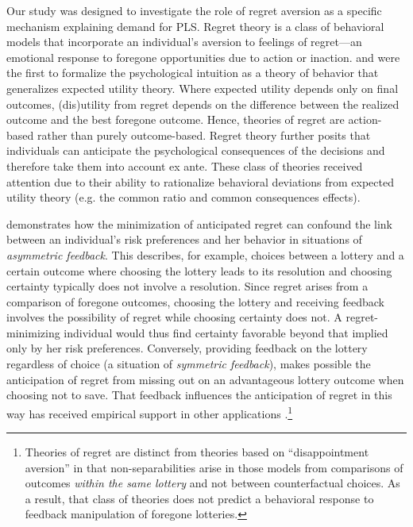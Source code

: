 \documentclass[12pt]{article}
\begin{document}
		Our study was designed to investigate the role of regret aversion as a specific mechanism explaining demand for PLS. Regret theory is a class of behavioral models that incorporate an individual's aversion to feelings of regret---an emotional response to foregone opportunities due to action or inaction. \textcite{bell_risk_1983} and \textcite{loomes_regret_1982} were the first to formalize the psychological intuition as a theory of behavior that generalizes expected utility theory. Where expected utility depends only on final outcomes, (dis)utility from regret depends on the difference between the realized outcome and the best foregone outcome. Hence, theories of regret are action-based rather than purely outcome-based. Regret theory further posits that individuals can anticipate the psychological consequences of the decisions and therefore take them into account ex ante. These class of theories received attention due to their ability to rationalize behavioral deviations from expected utility theory (e.g. the common ratio and common consequences effects).

		\textcite{zeelenberg_consequences_1996} demonstrates how the minimization of anticipated regret can confound the link between an individual's risk preferences and her behavior in situations of \emph{asymmetric feedback}. This describes, for example, choices between a lottery and a certain outcome where choosing the lottery leads to its resolution and choosing certainty typically does not involve a resolution. Since regret arises from a comparison of foregone outcomes, choosing the lottery and receiving feedback involves the possibility of regret while choosing certainty does not. A regret-minimizing individual would thus find certainty favorable beyond that implied only by her risk preferences. Conversely, providing feedback on the lottery regardless of choice (a situation of \emph{symmetric feedback}), makes possible the anticipation of regret from missing out on an advantageous lottery outcome when choosing not to save. That feedback influences the anticipation of regret in this way has received empirical support in other applications \parencite{somasundaram_regret_2017,filiz-ozbay_auctions_2007,zeelenberg_consequences_2004}.\footnote{Theories of regret are distinct from theories based on ``disappointment aversion'' \parencite{gul_theory_1991} in that non-separabilities arise in those models from comparisons of outcomes \emph{within the same lottery} and not between counterfactual choices. As a result, that class of theories does not predict a behavioral response to feedback manipulation of foregone lotteries.}
\end{document}
